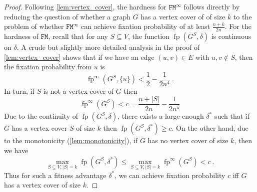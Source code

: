 \documentclass[letterpaper]{article}
\newcommand{\fp}{\operatorname{fp}}
\newcommand{\NodeActivationMoran}{\texttt{FM}}
\newcommand{\NodeActivationMoranStrong}{\texttt{FM}^{\infty}}
\newcommand{\FitAdv}{\delta}
\begin{document}
\thmnphard*
\begin{proof}
Following \cref{lem:vertex_cover}, the hardness for $\NodeActivationMoranStrong$ follows directly by reducing the question of whether a graph $G$ has a vertex cover of of size $k$ to the problem of whether $\NodeActivationMoranStrong$ can achieve fixation probability of at least $\frac{n+k}{2n}$.
For the hardness of $\NodeActivationMoran$, recall that for any $S\subseteq V$, the function $\fp(G^S,\FitAdv)$ is continuous on $\FitAdv$.
A crude but slightly more detailed analysis in the proof of \cref{lem:vertex_cover} shows that if we have an edge $(u,v)\in E$ with $u,v\not \in S$, then the fixation probability from $u$ is
\[
\fp^{\infty}(G^{S}, \{u\})< \frac{1}{2} - \frac{1}{2n^4} \ .
\]
In turn, if $S$ is not a vertex cover of $G$ then
\[
\fp^{\infty}(G^{S})<c=\frac{n+|S|}{2n}-\frac{1}{2n^5}
\] 
Due to the continuity of $\fp(G^S,\FitAdv)$, there exists a large enough $\FitAdv^*$ such that if $G$ has a vertex cover $S$ of size $k$ then $\fp(G^S,\FitAdv^*)\geq c$.
On the other hand, due to the monotonicity (\cref{lem:monotonicity}), 
if $G$ has no vertex cover of size $k$, then we have
\[
\max_{S\subseteq V, |S|=k}\fp(G^S,\FitAdv^*) \leq \max_{S\subseteq V, |S|=k} \fp^{\infty}(G^S) < c\ .
\]
Thus for such a fitness advantage $\FitAdv^*$, we can achieve fixation probability $c$ iff $G$ has a vertex cover of size $k$.
\end{proof}
\end{document}

